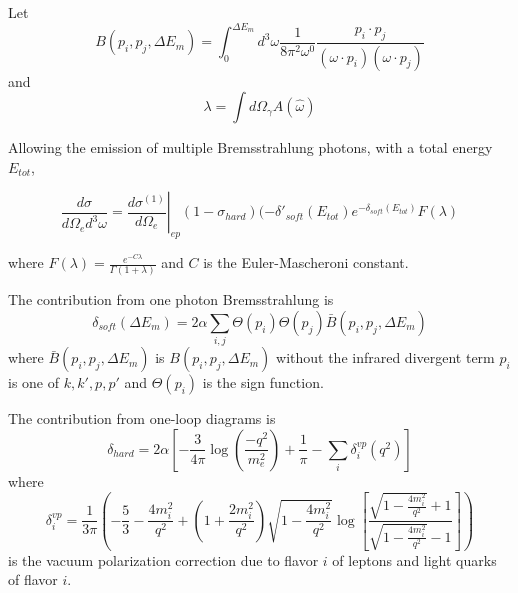 Let
\begin{equation}
    B(p_i, p_j, \Delta E_m) = \int_0^{\Delta E_m} d^3 \omega
    \frac{1}{8\pi^2\omega^0}
    \frac{p_i \cdot p_j}{(\omega \cdot p_i)(\omega \cdot p_j)}
\end{equation}
and
\begin{equation}
    \lambda = \int d\Omega_\gamma A(\hat{\omega})
\end{equation}

Allowing the emission of multiple Bremsstrahlung photons, with a total energy
$E_{tot}$,

\begin{equation}
    \frac{d\sigma}{d\Omega_e d^3\omega} =
        \left.\frac{d \sigma^{(1)}}{d \Omega_{e}}\right|_{e p}
        (1-\sigma_{hard})
        (-\delta'_{soft}(E_{tot})
        e^{-\delta_{soft}(E_{tot})}
        F(\lambda)
\end{equation}

where $F(\lambda)=\frac{e^{-C\lambda}}{\Gamma(1+\lambda)}$ and $C$ is the
Euler-Mascheroni constant.


The contribution from one photon Bremsstrahlung is
\begin{equation}
    \delta_{soft}(\Delta E_m) = 2\alpha \sum_{i,j} \Theta(p_i) \Theta(p_j)
                                                   \bar{B}(p_i,p_j,\Delta E_m)
\end{equation}
where $\bar{B}(p_i,p_j,\Delta E_m)$ is $B(p_i,p_j,\Delta E_m)$ without the
infrared divergent term
$p_i$ is one of $k,k',p,p'$
and
$\Theta(p_i)$ is the sign function.

The contribution from one-loop diagrams is
\begin{equation}
    \delta_{hard} = 2\alpha
                    \left[
                        -\frac{3}{4\pi}\log\left(\frac{-q^2}{m_e^2}\right)
                        + \frac{1}{\pi}
                        - \sum_i \delta^{vp}_i(q^2)
                    \right]
\end{equation}
where
\begin{equation}
    \delta^{vp}_i = \frac{1}{3 \pi}
                        \left(
                            -\frac{5}{3} - \frac{4 m_{i}^{2}}{q^{2}} +
                            \left(1+\frac{2 m_{i}^{2}}{q^{2}}\right)
                            \sqrt{1-\frac{4 m_{i}^{2}}{q^{2}}}
                            \log \left[\frac{\sqrt{1-\frac{4 m_{i}^{2}}{q^{2}}}+1}
                                            {\sqrt{1-\frac{4 m_{i}^{2}}{q^{2}}}-1}
                                 \right]
                        \right)
\end{equation}
is the vacuum polarization correction due to flavor $i$ of leptons and light quarks of flavor $i$.

